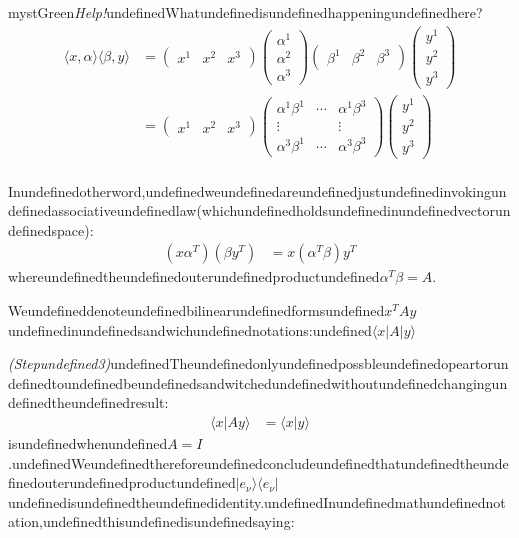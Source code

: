 \begin{mystadmonition}{mystGreen}{\emph{Help!}undefinedWhatundefinedisundefinedhappeningundefinedhere?}
\begin{equation}
\begin{aligned}
\langle x, \alpha \rangle \langle \beta, y \rangle &=
\begin{pmatrix}
x^1 & x^2 & x^3
\end{pmatrix}
\begin{pmatrix}
\alpha^1 \\ \alpha^2 \\ \alpha^3
\end{pmatrix}
\begin{pmatrix}
\beta^1 & \beta^2 & \beta^3
\end{pmatrix}
\begin{pmatrix}
y^1 \\ y^2 \\ y^3
\end{pmatrix} \\
&= 
\begin{pmatrix}
x^1 & x^2 & x^3
\end{pmatrix}
\begin{pmatrix}
\alpha^1 \beta^1 & \cdots & \alpha^1\beta^3 \\
\vdots & & \vdots \\
\alpha^3 \beta^1 & \cdots & \alpha^3\beta^3
\end{pmatrix}
\begin{pmatrix}
y^1 \\ y^2 \\ y^3
\end{pmatrix} \\
\end{aligned}
\end{equation}

Inundefinedotherword,undefinedweundefinedareundefinedjustundefinedinvokingundefinedassociativeundefinedlaw(whichundefinedholdsundefinedinundefinedvectorundefinedspace):
\begin{equation}
\begin{aligned}
(x\alpha^T) (\beta y^T)&=x(\alpha^T \beta) y^T
\end{aligned}
\end{equation}
whereundefinedtheundefinedouterundefinedproductundefined$\alpha^T \beta=A$.

Weundefineddenoteundefinedbilinearundefinedformsundefined$x^TAy$undefinedinundefinedsandwichundefinednotations:undefined$\langle x |A|y\rangle$

\textit{(Stepundefined3)}undefinedTheundefinedonlyundefinedpossbleundefinedopeartorundefinedtoundefinedbeundefinedsandwitchedundefinedwithoutundefinedchangingundefinedtheundefinedresult:
\begin{equation}
\begin{aligned}
\langle x|Ay\rangle &= \langle x | y\rangle
\end{aligned}
\end{equation}
isundefinedwhenundefined$A=I$.undefinedWeundefinedthereforeundefinedconcludeundefinedthatundefinedtheundefinedouterundefinedproductundefined$|e_{\nu}\rangle \langle e_{\nu}|$undefinedisundefinedtheundefinedidentity.undefinedInundefinedmathundefinednotation,undefinedthisundefinedisundefinedsaying:


\end{mystadmonition}
